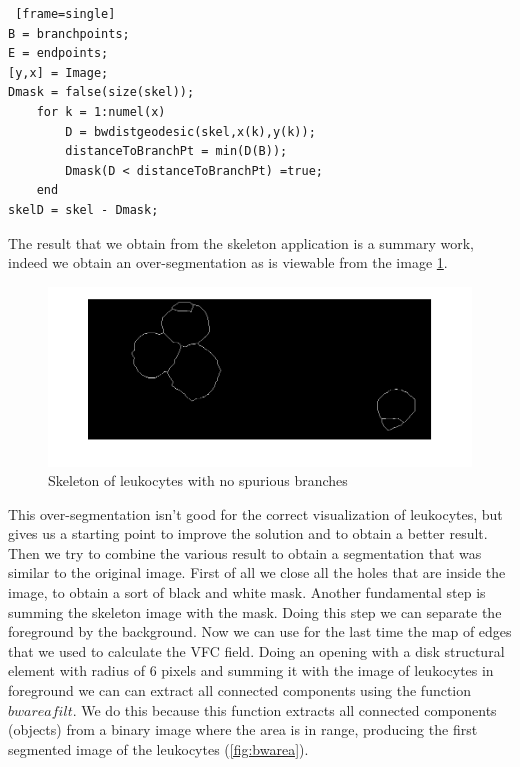 \begin{minipage}{\linewidth}
\begin{scriptsize}
	\begin{lstlisting} [frame=single]
B = branchpoints;
E = endpoints;
[y,x] = Image;
Dmask = false(size(skel));
	for k = 1:numel(x)
    	D = bwdistgeodesic(skel,x(k),y(k));
    	distanceToBranchPt = min(D(B));
    	Dmask(D < distanceToBranchPt) =true;
	end
skelD = skel - Dmask;
	\end{lstlisting}
\end{scriptsize}
\end{minipage}
The result that we obtain from the skeleton application is a summary work, indeed we obtain an over-segmentation as is viewable from the image \ref{fig:skelfin}.
\begin{figure}
	\begin{center}
		\centering
		\includegraphics[scale=0.5]{img/skelfin.png}
		\caption{Skeleton of leukocytes with no spurious branches}
		\label{fig:skelfin}
	\end{center}
\end{figure}
This over-segmentation isn't good for the correct visualization of leukocytes, but gives us a starting point to improve the solution and to obtain a better result.
Then we try to combine the various result to obtain a segmentation that was similar to the original image. First of all we close all the holes that are inside the image, to obtain a sort of black and white mask. Another fundamental step is summing the skeleton image with the mask. Doing this step we can separate the foreground by the background. Now we can use for the last time the map of edges that we used to calculate the VFC field. Doing an opening with a disk structural element with radius of 6 pixels and summing it with the image of leukocytes in foreground  we can can extract all connected components using the function $bwareafilt$. We do this because this function extracts all connected components (objects) from a binary image where the area is in range, producing the first segmented image of the leukocytes (\ref{fig:bwarea}).
